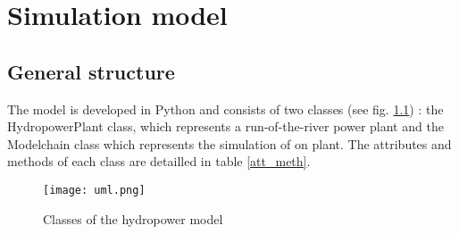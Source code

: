 \chapter{Simulation model}
\label{chap:simulation_model}

\section{General structure}

The model is developed in Python and consists of two classes (see fig. \ref{uml}) : the HydropowerPlant class, which represents a run-of-the-river power plant and the Modelchain class which represents the simulation of on plant. The attributes and methods of each class are detailled in table \ref{att_meth}.
\begin{figure}[H]
\center
\texttt{[image: uml.png]}
\caption{Classes of the hydropower model}
\label{uml}
\end{figure}

